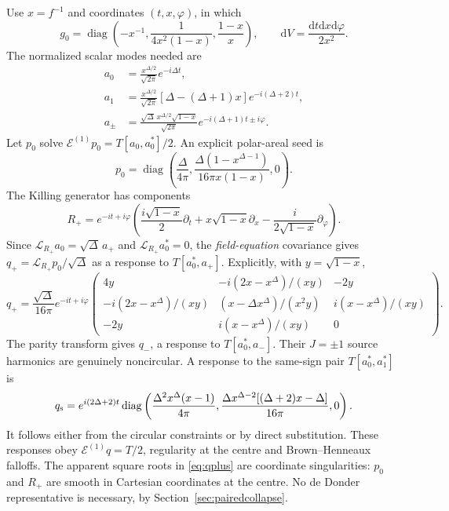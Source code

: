 \documentclass[11pt,a4paper]{article}
\numberwithin{equation}{section}
\theoremstyle{remark}\newtheorem{remark}[theorem]{Remark}
\newcommand{\dd}{\mathrm d}
\begin{document}
Use $x=f^{-1}$ and coordinates $(t,x,\varphi)$, in which
\begin{equation}
 g_0=\operatorname{diag}\left(-x^{-1},\frac1{4x^2(1-x)},\frac{1-x}{x}\right),
 \qquad \dd V=\frac{\dd t\dd x\dd\varphi}{2x^2}.
\end{equation}
The normalized scalar modes needed are
\begin{align}
 a_0&=\frac{x^{\Delta/2}}{\sqrt{2\pi}}e^{-i\Delta t},\nonumber\\
 a_1&=\frac{x^{\Delta/2}}{\sqrt{2\pi}}
       [\Delta-(\Delta+1)x]e^{-i(\Delta+2)t},\nonumber\\
 a_\pm&=\frac{\sqrt\Delta\,x^{\Delta/2}\sqrt{1-x}}{\sqrt{2\pi}}
       e^{-i(\Delta+1)t\pm i\varphi}.
 \label{eq:ABmodes}
\end{align}
Let $p_0$ solve $\mathcal E^{(1)}p_0=T[a_0,a_0^*]/2$. An explicit polar-areal seed is
\begin{equation}
 p_0=\operatorname{diag}\left(
 \frac\Delta{4\pi},\frac{\Delta(1-x^{\Delta-1})}{16\pi x(1-x)},0\right).
 \label{eq:seednoncirc}
\end{equation}
The Killing generator has components
\begin{equation}
 R_+=e^{-it+i\varphi}\left(
 \frac{i\sqrt{1-x}}2\partial_t+x\sqrt{1-x}\partial_x
 -\frac{i}{2\sqrt{1-x}}\partial_\varphi\right).
\end{equation}
Since $\mathcal L_{R_+}a_0=\sqrt\Delta\,a_+$ and
$\mathcal L_{R_+}a_0^*=0$, the \emph{field-equation} covariance gives
$q_+=\mathcal L_{R_+}p_0/\sqrt\Delta$ as a response to $T[a_0^*,a_+]$.
Explicitly, with $y=\sqrt{1-x}$,
\begin{equation}
 q_+=\frac{\sqrt\Delta}{16\pi}e^{-it+i\varphi}
 \begin{pmatrix}
 4y&-i(2x-x^\Delta)/(xy)&-2y\\
 -i(2x-x^\Delta)/(xy)&(x-\Delta x^\Delta)/(x^2y)&i(x-x^\Delta)/(xy)\\
 -2y&i(x-x^\Delta)/(xy)&0
 \end{pmatrix}.
 \label{eq:qplus}
\end{equation}
The parity transform gives $q_-$, a response to $T[a_0^*,a_-]$. Their $J=\pm1$ source harmonics are genuinely noncircular. A response to the same-sign pair $T[a_0^*,a_1^*]$ is
\begin{equation}
 q_{\rm s}=e^{i(2\Delta+2)t}\operatorname{diag}\left(
 \frac{\Delta^2x^\Delta(x-1)}{4\pi},
 \frac{\Delta x^{\Delta-2}[(\Delta+2)x-\Delta]}{16\pi},0\right).
 \label{eq:qABsame}
\end{equation}
It follows either from the circular constraints or by direct substitution. These responses obey $\mathcal E^{(1)}q=T/2$, regularity at the centre and Brown--Henneaux falloffs. The apparent square roots in \eqref{eq:qplus} are coordinate singularities: $p_0$ and $R_+$ are smooth in Cartesian coordinates at the centre. No de Donder representative is necessary, by Section~\ref{sec:pairedcollapse}.
\end{document}
